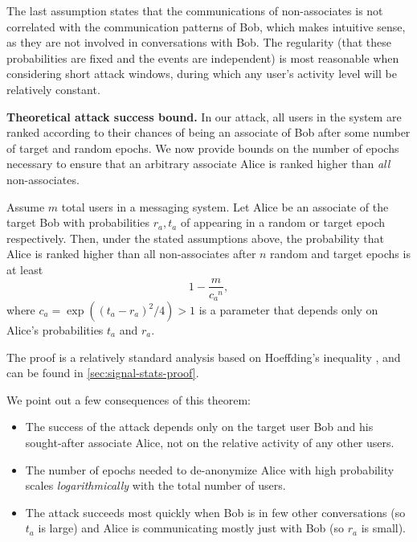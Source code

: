 The last assumption states that the communications of non-associates is
not correlated with the communication patterns of Bob, which
makes intuitive sense, as they are not involved in conversations with Bob.
The regularity (that these probabilities are
fixed and the events are independent)
is most reasonable when considering short attack windows, during
which any user's activity level will be relatively constant.

\medskip \noindent
\textbf{Theoretical attack success bound.} In our attack, all users in the system are ranked according
to their chances of being an associate of Bob after some number of
target and random epochs. We now provide bounds on the number of epochs
necessary to ensure that an arbitrary associate Alice is ranked higher
than \emph{all} non-associates.

\begin{theorem}\label{thm:stats}
  Assume $m$ total users in a messaging system.
  Let Alice be an associate of the target Bob with
  probabilities $r_a, t_a$ of appearing in a random or target epoch
  respectively. Then, under the stated assumptions above, the
  probability that Alice is ranked higher than all non-associates after
  $n$ random and target epochs is at least
  \[1 - \frac{m}{c_a^{\phantom{a}n}},\]
  where $c_a = \exp((t_a-r_a)^2/4) > 1$ is a parameter that depends only
  on Alice's probabilities $t_a$ and $r_a$.
\end{theorem}

The proof is a relatively standard analysis based on Hoeffding's
inequality \cite{hoeffding}, and can be found in \cref{sec:signal-stats-proof}.

We point out a few consequences of this theorem:
\begin{itemize}[nosep]
  \item The success of the attack depends only on the target user Bob
    and his sought-after associate Alice, not on the relative activity
    of any other users.
  \item The number of epochs needed to de-anonymize Alice with high
    probability scales \emph{logarithmically} with the total number of
    users.
  \item The attack succeeds most quickly when Bob is in few other conversations
    (so $t_a$ is large) and
    Alice is communicating mostly just with Bob (so $r_a$ is small).
\end{itemize}

